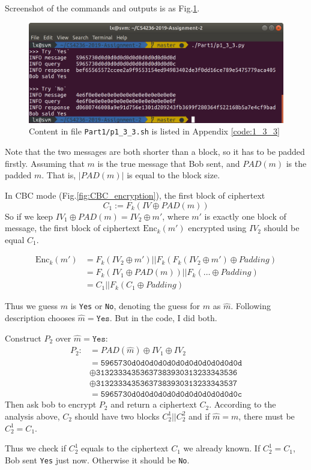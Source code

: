 Screenshot of the commands and outputs is as Fig.\ref{fig:p1_3_3}.

\begin{figure}[tb!]
\centering
\includegraphics[width=\columnwidth]{pictures/p1_3_3.png}
\caption{
    Content in file \texttt{Part1/p1\_3\_3.sh} is listed in Appendix \ref{code:1_3_3}
}
\label{fig:p1_3_3}
\end{figure}

Note that the two messages are both shorter than a block, so it has to be padded firstly. Assuming that $m$ is the true message that Bob sent, and $PAD(m)$ is the padded $m$. 
That is, $|PAD(m)|$ is equal to the block size.

In CBC mode (Fig.\ref{fig:CBC_encryption}), the first block of ciphertext $$ C_1 := F_k(IV \oplus PAD(m)) $$
So if we keep $IV_1 \oplus PAD(m) = IV_2 \oplus m'$, where $m'$ is exactly one block of message, the first block of ciphertext $\mathrm{Enc}_k(m')$ encrypted using $IV_2$ should be equal $C_1$.

\begin{align*}
\mathrm{Enc}_k(m') &= F_k(IV_2 \oplus m') || F_k(F_k(IV_2 \oplus m') \oplus Padding) \\
&= F_k(IV_1 \oplus PAD(m)) || F_k(\ldots \oplus Padding) \\
&= C_1 || F_k(C_1 \oplus Padding)
\end{align*}

Thus we guess $m$ is \texttt{Yes} or \texttt{No}, denoting the guess for $m$ as $\hat{m}$. 
Following description chooses $\hat{m} = \mathtt{Yes}$. But in the code, I did both.

Construct $P_2$ over $\hat{m} = \mathtt{Yes}$:
\begin{align*}
P_2 
:&= PAD(\hat{m}) \oplus IV_1 \oplus IV_2 \\
&= \mathtt{5965730d0d0d0d0d0d0d0d0d0d0d0d0d} \\ 
&  \oplus \mathtt{31323334353637383930313233343536} \\
&  \oplus \mathtt{31323334353637383930313233343537} \\
&= \mathtt{5965730d0d0d0d0d0d0d0d0d0d0d0d0c}
\end{align*}
Then ask bob to encrypt $P_2$ and return a ciphertext $C_2$.
According to the analysis above, $C_2$ should have two blocks $C^1_2 || C^2_2$ and if $\hat{m} = m$, there must be $C^1_2 = C_1$.

Thus we check if $C^1_2$ equals to the ciphertext $C_1$ we already known. If $C^1_2 = C_1$, Bob sent \texttt{Yes} just now. Otherwise it should be \texttt{No}.
